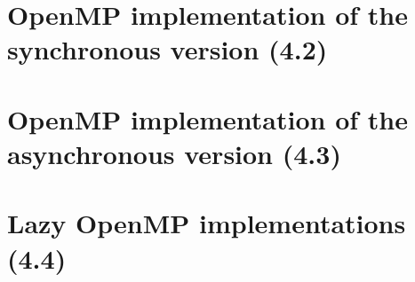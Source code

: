 \documentclass[10pt, a4paper]{article}
\begin{document}

\section{OpenMP implementation of the synchronous version (4.2)}





\section{OpenMP implementation of the asynchronous version (4.3)}

\section{Lazy OpenMP implementations (4.4)}




\end{document}

